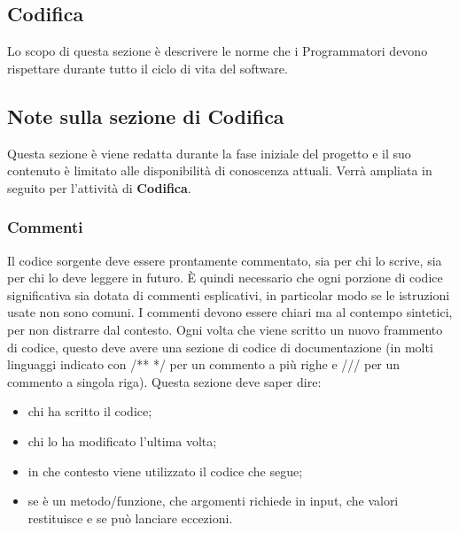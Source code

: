 \subsection{Codifica}
Lo scopo di questa sezione è descrivere le norme che i Programmatori devono rispettare durante tutto il ciclo di vita del software.

\subsection*{Note sulla sezione di Codifica}
Questa sezione è viene redatta durante la fase iniziale del progetto e il suo contenuto è limitato alle disponibilità di conoscenza attuali.
Verrà ampliata in seguito per l'attività di \textbf{Codifica}.

\subsubsection{Commenti}
Il codice sorgente deve essere prontamente commentato, sia per chi lo scrive, sia per chi lo deve leggere in futuro.
È quindi necessario che ogni porzione di codice significativa sia dotata di commenti esplicativi, in particolar modo se le istruzioni usate non sono comuni.
I commenti devono essere chiari ma al contempo sintetici, per non distrarre dal contesto.
Ogni volta che viene scritto un nuovo frammento di codice, questo deve avere una sezione di codice di documentazione (in molti linguaggi indicato con /** */ per un commento a più righe e /// per un commento a singola riga).
Questa sezione deve saper dire:
\begin{itemize}
    \item chi ha scritto il codice;
    \item chi lo ha modificato l'ultima volta;
    \item in che contesto viene utilizzato il codice che segue;
    \item se è un metodo/funzione, che argomenti richiede in input, che valori restituisce e se può lanciare eccezioni.
\end{itemize}

